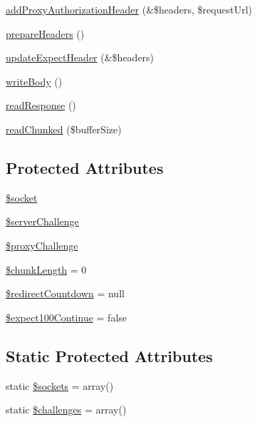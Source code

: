 \begin{DoxyCompactItemize}
\hyperlink{classHTTP__Request2__Adapter__Socket_a65649f201171f34f2db163033fbfde27}{add\+Proxy\+Authorization\+Header} (\&\$headers, \$request\+Url)
\item 
\hyperlink{classHTTP__Request2__Adapter__Socket_a8715074a6226005aa4db694a899c759b}{prepare\+Headers} ()
\item 
\hyperlink{classHTTP__Request2__Adapter__Socket_a7a547941e41ce97677f3217284a0c447}{update\+Expect\+Header} (\&\$headers)
\item 
\hyperlink{classHTTP__Request2__Adapter__Socket_a091decf5cd08db3d422e3d50dafa4122}{write\+Body} ()
\item 
\hyperlink{classHTTP__Request2__Adapter__Socket_ace322a437e3d44b48bd44c2d452e0ad0}{read\+Response} ()
\item 
\hyperlink{classHTTP__Request2__Adapter__Socket_a2a5a784d7631133a5713476ee96c62ed}{read\+Chunked} (\$buffer\+Size)
\end{DoxyCompactItemize}
\subsection*{Protected Attributes}
\begin{DoxyCompactItemize}
\item 
\hyperlink{classHTTP__Request2__Adapter__Socket_ad9f67426c07302e3867c01577fffc27b}{\$socket}
\item 
\hyperlink{classHTTP__Request2__Adapter__Socket_a39896645b7671bfc2af02c5db7853341}{\$server\+Challenge}
\item 
\hyperlink{classHTTP__Request2__Adapter__Socket_a0b3a0d18548e354e248253f67e1d5f50}{\$proxy\+Challenge}
\item 
\hyperlink{classHTTP__Request2__Adapter__Socket_add96406caddf7540cc0525dee2aa479f}{\$chunk\+Length} = 0
\item 
\hyperlink{classHTTP__Request2__Adapter__Socket_a667d94f4db2e719a1c17809a3ff3d355}{\$redirect\+Countdown} = null
\item 
\hyperlink{classHTTP__Request2__Adapter__Socket_afd2a8a4a59755ae2fb901741774cb02c}{\$expect100\+Continue} = false
\end{DoxyCompactItemize}
\subsection*{Static Protected Attributes}
\begin{DoxyCompactItemize}
\item 
static \hyperlink{classHTTP__Request2__Adapter__Socket_ac7d848682d9289b2c270abb214338455}{\$sockets} = array()
\item 
static \hyperlink{classHTTP__Request2__Adapter__Socket_ae4456b3dff588030e66270e99d29e589}{\$challenges} = array()
\end{DoxyCompactItemize}


